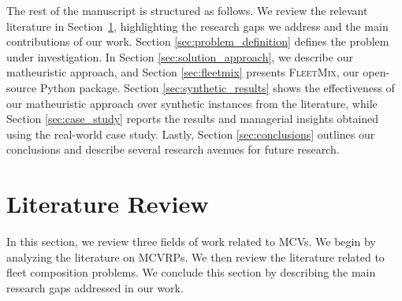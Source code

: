 \documentclass[11pt]{elsarticle}
\theoremstyle{plain}
\newcommand{\blue}[1]{#1}
\begin{document}
The rest of the manuscript is structured as follows. We review the relevant literature in Section~\ref{sec:literature}, highlighting the research gaps we address and the main contributions of our work. Section \ref{sec:problem_definition} defines the problem under investigation. In Section \ref{sec:solution_approach}, we describe our matheuristic approach, and Section \ref{sec:fleetmix} presents \textsc{FleetMix}, our open-source Python package.
Section \ref{sec:synthetic_results} shows the effectiveness of our matheuristic approach over synthetic instances from the literature, while Section \ref{sec:case_study} reports the results and managerial insights obtained using the real-world case study. Lastly, Section \ref{sec:conclusions} outlines our conclusions and describe several research avenues for future research.

\section{Literature Review} \label{sec:literature}

In this section, we review three fields of work related to \acp{MCV}. We begin by analyzing the literature \blue{on \acp{MCVRP}. We then} review the literature related to fleet composition problems. We conclude this section by describing the main research gaps \blue{addressed in} our work.
\end{document}

